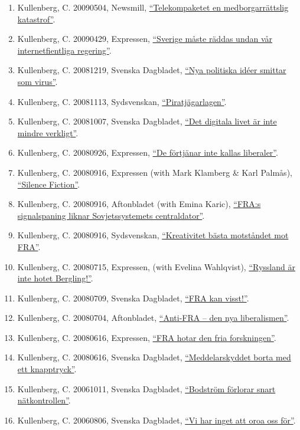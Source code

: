 \documentclass[
]{article}
\begin{document}
\begin{enumerate}
{  bästa rapporteringen kring EU:s viktigaste fråga''}.
\item
  Kullenberg, C. 20090504, Newsmill, \href{}{``Telekompaketet en
  medborgarrättslig katastrof''}.
\item
  Kullenberg, C. 20090429, Expressen,
  \href{http://www.expressen.se/debatt/sverige-maste-raddas-undan-var-internetfientliga-regering/}{``Sverige
  måste räddas undan vår internetfientliga regering''}.
\item
  Kullenberg, C. 20081219, Svenska Dagbladet, \href{}{``Nya politiska
  idéer smittar som virus''}.
\item
  Kullenberg, C. 20081113, Sydsvenskan,
  \href{http://www.sydsvenskan.se/2008-11-12/piratjagarlagen}{``Piratjägarlagen''}.
\item
  Kullenberg, C. 20081007, Svenska Dagbladet,
  \href{http://www.svd.se/det-digitala-livet-ar-inte-mindre-verkligt}{``Det
  digitala livet är inte mindre verkligt''}.
\item
  Kullenberg, C. 20080926, Expressen, \href{}{``De förtjänar inte kallas
  liberaler''}.
\item
  Kullenberg, C. 20080916, Expressen (with Mark Klamberg \& Karl
  Palmås),
  \href{http://www.expressen.se/kultur/silence-fiction/}{``Silence
  Fiction''}.
\item
  Kullenberg, C. 20080916, Aftonbladet (with Emina Karic),
  \href{}{``FRA:s signalspaning liknar Sovjetssystemets centraldator''}.
\item
  Kullenberg, C. 20080916, Sydsvenskan, \href{}{``Kreativitet bästa
  motståndet mot FRA''}.
\item
  Kullenberg, C. 20080715, Expressen, (with Evelina Wahlqvist),
  \href{http://www.expressen.se/debatt/ryssland-ar-inte-hotet-bergling/}{``Ryssland
  är inte hotet Bergling!''}.
\item
  Kullenberg, C. 20080709, Svenska Dagbladet,
  \href{http://www.svd.se/fra-kan-visst}{``FRA kan visst!''}.
\item
  Kullenberg, C. 20080704, Aftonbladet, \href{}{``Anti-FRA -- den nya
  liberalismen''}.
\item
  Kullenberg, C. 20080616, Expressen,
  \href{http://www.expressen.se/debatt/fra-lagen-hindrar-fria-forskningen/}{``FRA
  hotar den fria forskningen''}.
\item
  Kullenberg, C. 20080616, Svenska Dagbladet,
  \href{http://www.svd.se/meddelarskyddet-bort-med-ett-knapptryck}{``Meddelarskyddet
  borta med ett knapptryck''}.
\item
  Kullenberg, C. 20061011, Svenska Dagbladet,
  \href{http://www.svd.se/bodstrom-forlorar-snart-natkontrollen}{``Bodström
  förlorar snart nätkontrollen''}.
\item
  Kullenberg, C. 20060806, Svenska Dagbladet,
  \href{http://www.svd.se/vi-har-inget-att-oroa-oss-for}{``Vi har inget
  att oroa oss för''}.
\end{enumerate}
\end{document}
